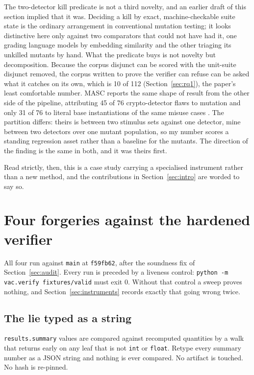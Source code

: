 \documentclass[11pt]{article}
\begin{document}
The two-detector kill predicate is not a third novelty, and an earlier draft of this section
implied that it was. Deciding a kill by exact, machine-checkable suite state is the ordinary
arrangement in conventional mutation testing; it looks distinctive here only against two
comparators that could not have had it, one grading language models by embedding similarity
and the other triaging its unkilled mutants by hand. What the predicate buys is not novelty
but decomposition. Because the corpus disjunct can be scored with the unit-suite disjunct
removed, the corpus written to prove the verifier can refuse can be asked what it catches on
its own, which is 10 of 112 (Section~\ref{sec:rq1}), the paper's least comfortable number.
MASC reports the same shape of result from the other side of the pipeline, attributing 45 of
76 crypto-detector flaws to mutation and only 31 of 76 to literal base instantiations of the
same misuse cases \citep{ami2022masc}. The partition differs: theirs is between two stimulus
sets against one detector, mine between two detectors over one mutant population, so my
number scores a standing regression asset rather than a baseline for the mutants. The
direction of the finding is the same in both, and it was theirs first.

Read strictly, then, this is a case study carrying a specialised instrument rather than a new
method, and the contributions in Section~\ref{sec:intro} are worded to say so.

\section{Four forgeries against the hardened verifier}
\label{sec:forgeries}

All four run against \texttt{main} at \texttt{f59fb62}, after the soundness fix of
Section~\ref{sec:audit}. Every run is preceded by a liveness control:
\texttt{python -m vac.verify fixtures/valid} must exit 0. Without that control a sweep proves
nothing, and Section~\ref{sec:instruments} records exactly that going wrong twice.

\subsection{The lie typed as a string}
\label{sec:sec-forge-summary}

\texttt{results.summary} values are compared against recomputed quantities by a walk that
returns early on any leaf that is not \texttt{int} or \texttt{float}. Retype every summary
number as a JSON string and nothing is ever compared. No artifact is touched. No hash is
re-pinned.
\end{document}
